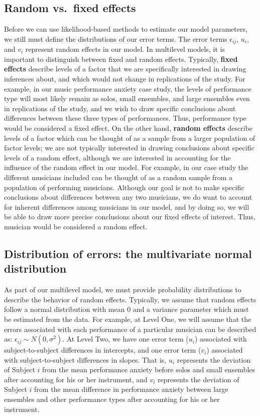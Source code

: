 \documentclass[
]{krantz}
\begin{document}
\hypertarget{random-vs.-fixed-effects}{%
\subsection{Random vs.~fixed effects}\label{random-vs.-fixed-effects}}

Before we can use likelihood-based methods to estimate our model parameters, we still must define the distributions of our error terms. The error terms \(\epsilon_{ij}\), \(u_{i}\), and \(v_{i}\) represent random effects in our model. In multilevel models, it is important to distinguish between fixed and random effects. Typically, \textbf{fixed effects} describe levels of a factor that we are specifically interested in drawing inferences about, and which would not change in replications of the study. For example, in our music performance anxiety case study, the levels of performance type will most likely remain as solos, small ensembles, and large ensembles even in replications of the study, and we wish to draw specific conclusions about differences between these three types of performances. Thus, performance type would be considered a fixed effect. On the other hand, \textbf{random effects} describe levels of a factor which can be thought of as a sample from a larger population of factor levels; we are not typically interested in drawing conclusions about specific levels of a random effect, although we are interested in accounting for the influence of the random effect in our model. For example, in our case study the different musicians included can be thought of as a random sample from a population of performing musicians. Although our goal is not to make specific conclusions about differences between any two musicians, we do want to account for inherent differences among musicians in our model, and by doing so, we will be able to draw more precise conclusions about our fixed effects of interest. Thus, musician would be considered a random effect.

\hypertarget{MVN}{%
\subsection{Distribution of errors: the multivariate normal distribution}\label{MVN}}

As part of our multilevel model, we must provide probability distributions to describe the behavior of random effects. Typically, we assume that random effects follow a normal distribution with mean 0 and a variance parameter which must be estimated from the data. For example, at Level One, we will assume that the errors associated with each performance of a particular musician can be described as: \(\epsilon_{ij}\sim N(0,\sigma^2)\). At Level Two, we have one error term (\(u_{i}\)) associated with subject-to-subject differences in intercepts, and one error term (\(v_{i}\)) associated with subject-to-subject differences in slopes. That is, \(u_{i}\) represents the deviation of Subject \(i\) from the mean performance anxiety before solos and small ensembles after accounting for his or her instrument, and \(v_{i}\) represents the deviation of Subject \(i\) from the mean difference in performance anxiety between large ensembles and other performance types after accounting for his or her instrument.
\end{document}
